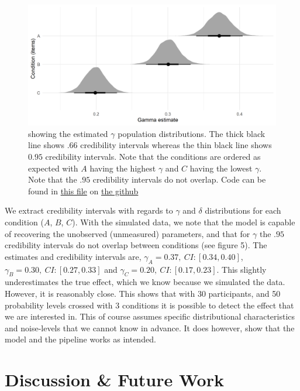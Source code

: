 \documentclass[12pt]{article}
\begin{document}
\begin{figure}[H]
	\includegraphics[width = \linewidth]{../Figures/gamma.png}
	\caption{showing the estimated  $\gamma$
	population distributions. The thick
	black line shows  $.66$ credibility intervals
	whereas the thin black line shows  $0.95$
	credibility intervals. Note that the
	conditions are ordered as expected with
	 $A$ having the highest  $\gamma$ and
	 $C$ having the lowest  $\gamma$.
	 Note that the  $.95$ credibility
	 intervals do not overlap. Code can
 be found in
 \href{https://github.com/victor-m-p/BayesianDecisionWeights/blob/main/Code/4_testing_hypotheses.Rmd}{this
 file} on \href{https://github.com/victor-m-p/BayesianDecisionWeights}{the
 github}}
 \end{figure}

We extract credibility intervals with regards
to $\gamma$ and $\delta$ distributions for each
condition ($A$, $B$, $C$). With the simulated
data, we note that the model is capable of
recovering the unobserved (unmeasured) parameters,
and that for $\gamma$ the  $.95$ credibility
intervals do not overlap between conditions
(see figure 5). The estimates and credibility intervals
are, $\gamma_{A} = 0.37, \: CI: [0.34, 0.40]$,
$\gamma_{B} = 0.30, \: CI: [0.27, 0.33]$ and
$\gamma_{C} = 0.20, \: CI: [0.17, 0.23]$.
This slightly underestimates the true effect, which
we know because we simulated the data. However, it
is reasonably close. This shows that with $30$
participants, and 50 probability levels crossed with
3 conditions it is possible to detect the effect
that we are interested in. This of course assumes specific
distributional characteristics and noise-levels
that we cannot know in advance. It does however, show
that the model and the pipeline works as intended.

\section{Discussion \& Future Work}
\end{document}
